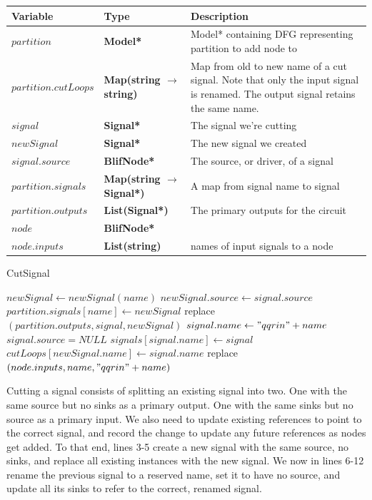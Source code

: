 \documentclass[12pt,final,oneside]{article} %
\begin{document}
\begin{algorithm}
    \begin{center}
        \begin{tabularx}{\linewidth}{llX}
        \toprule
        Variable & Type & Description\\
        \midrule
        $partition$ &\bf  Model* & Model* containing DFG representing partition to add node to\\
        $partition.cutLoops$ &\bf  Map(string $\to$ string) & Map from old to new name of a cut signal. Note that only the input signal is renamed. The output signal retains the same name.\\
        $signal$ &\bf  Signal* & The signal we're cutting\\
        $newSignal$ &\bf  Signal* & The new signal we created\\
        $signal.source$ &\bf  BlifNode* & The source, or driver, of a signal\\
        $partition.signals$ &\bf  Map(string $\to$ Signal*) & A map from signal name to signal\\
        $partition.outputs$ &\bf  List(Signal*) & The primary outputs for the circuit\\
        $node$ &\bf  BlifNode* & \\
        $node.inputs$ &\bf  List(string) & names of input signals to a node\\
        \bottomrule
        \end{tabularx}
    \end{center}
   \caption{CutSignal}\label{cutsignal}
   \begin{algorithmic}[1]
         \State $newSignal \gets new Signal(name)$ 
         \State $newSignal.source \gets signal.source$
         \State $partition.signals[name] \gets newSignal$
         \State replace$(partition.outputs, signal, newSignal)$ 
         \State $signal.name \gets "qqrin"+name$
         \State $signal.source = NULL$
         \State $signals[signal.name] \gets signal$
         \State $cutLoops[newSignal.name] \gets signal.name$
            \State replace$(node.inputs, name, "qqrin"+name)$
         \EndFor
      \EndProcedure
   \end{algorithmic}
\end{algorithm}
Cutting a signal consists of splitting an existing signal into two. One with the same source but no sinks as a primary output. One with the same sinks but no source as a primary input. We also need to update existing references to point to the correct signal, and record the change to update any future references as nodes get added.
To that end, lines 3-5 create a new signal with the same source, no sinks, and replace all existing instances with the new signal.
We now in lines 6-12 rename the previous signal to a reserved name, set it to have no source, and update all its sinks to refer to the correct, renamed signal.
\end{document}
